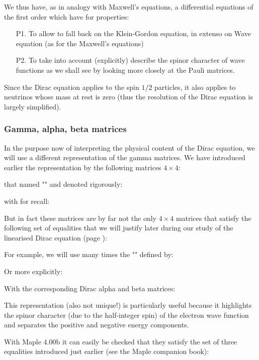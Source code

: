 	
	We thus have, as in analogy with Maxwell's equations, a differential equations of the first order which have for properties:
	\begin{enumerate}
		\item[P1.] To allow to fall back on the Klein-Gordon equation, in extenso on Wave equation (as for the Maxwell's equations)

		\item[P2.] To take into account (explicitly) describe the spinor character of wave functions as we shall see by looking more closely at the Pauli matrices.
	\end{enumerate}
	\begin{tcolorbox}[title=Remark,colframe=black,arc=10pt]
	Since the Dirac equation applies to the spin $1/2$ particles, it also applies to neutrinos whose mass at rest is zero (thus the resolution of the Dirac equation is largely simplified).
	\end{tcolorbox}
	
	\subsubsection{Gamma, alpha, beta matrices}
	In the purpose now of interpreting the physical content of the Dirac equation, we will use a different representation of the gamma matrices. We have introduced earlier the representation by the following matrices $4\times 4$:
	
	that named "" and denoted rigorously:
	
	with for recall:
	
	But in fact these matrices are by far not the only $4\times 4$ matrices that satisfy the following set of equalities that we will justify later during our study of the linearised Dirac equation (page \pageref{linearized dirac equation}):
	
	For example, we will use many times the "" defined by:
	
	Or more explicitly:
	
	With the corresponding Dirac alpha and beta matrices:
	
	This representation (also not unique!) is particularly useful because it highlights the spinor character (due to the half-integer spin) of the electron wave function and separates the positive and negative energy components.
	
	With Maple 4.00b it can easily be checked that they satisfy the set of three equalities introduced just earlier (see the Maple companion book):\\
	
